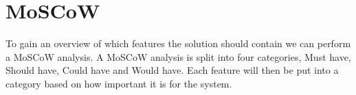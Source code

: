 \section{MoSCoW}

To gain an overview of which features the solution should contain we can perform a MoSCoW analysis.
A MoSCoW analysis is split into four categories, Must have, Should have, Could have and Would have. Each feature will then be put into a category based on how important it is for the system.


